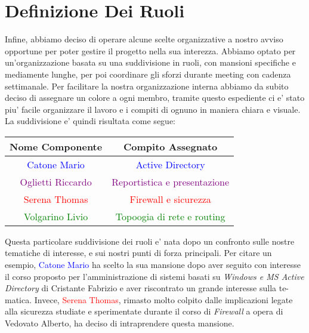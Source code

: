 \documentclass{report}
\begin{document}
		\section{Definizione Dei Ruoli}
			Infine, abbiamo deciso di operare alcune scelte organizzative a nostro avviso opportune per poter gestire il
			progetto nella sua interezza. Abbiamo optato per un'organizzazione basata su una suddivisione in ruoli, con
			mansioni specifiche e mediamente lunghe, per poi coordinare gli sforzi durante meeting con cadenza settimanale.
			Per facilitare la nostra organizzazione interna abbiamo da subito deciso di assegnare un colore a ogni membro,
			tramite questo espediente ci e' stato piu' facile organizzare il lavoro e i compiti di ognuno in maniera chiara
			e visuale. 
			La suddivisione e' quindi risultata come segue:
			\begin{center}
				\begin{tabular}{ |c|c| }
					\hline
					Nome Componente & Compito Assegnato \\
					\hline \hline
					\textcolor{Blue}{Catone Mario} & \textcolor{Blue}{Active Directory} \\
					\hline
					\textcolor{Purple}{Oglietti Riccardo} & \textcolor{Purple}{Reportistica e presentazione} \\
					\hline
					\textcolor{Red}{Serena Thomas} & \textcolor{Red}{Firewall e sicurezza} \\
					\hline
					\textcolor{Green}{Volgarino Livio} & \textcolor{Green}{Topoogia di rete e routing} \\
					\hline
				\end{tabular}
			\end{center}
			Questa particolare suddivisione dei ruoli e' nata dopo un confronto sulle nostre tematiche di interesse, e sui
			nostri punti di forza principali. Per citare un esempio, \textcolor{Blue}{Catone Mario} ha scelto la sua mansione
			dopo aver seguito con interesse il corso proposto per l'amministrazione di sistemi basati su \emph{Windows e MS
			Active Directory} di Cristante Fabrizio e aver riscontrato un grande interesse sulla te-\\matica. Invece,
			\textcolor{Red}{Serena Thomas}, rimasto molto colpito dalle implicazioni legate alla sicurezza studiate e
			sperimentate durante il corso di \emph{Firewall} a opera di Vedovato Alberto, ha deciso di intraprendere
			questa mansione.
\end{document}
